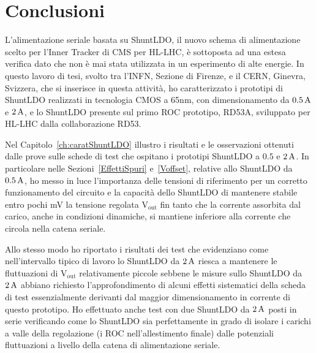 \chapter{Conclusioni}

L'alimentazione seriale basata su ShuntLDO, il nuovo schema di alimentazione scelto per l'Inner Tracker di CMS per HL-LHC, \`e sottoposta ad una estesa verifica dato che non \`e mai stata utilizzata in un esperimento di alte energie. In questo lavoro di tesi, svolto tra l'INFN, Sezione di Firenze, e il CERN, Ginevra, Svizzera, che si inserisce in questa attivit\`a, ho  caratterizzato i prototipi di ShuntLDO realizzati in tecnologia CMOS a 65nm, con dimensionamento da $0.5\rm \, A$ e $2\rm \, A$, e lo ShuntLDO presente sul primo ROC prototipo, RD53A, sviluppato per HL-LHC dalla collaborazione RD53.




Nel Capitolo~\ref{ch:caratShuntLDO} illustro i risultati e le osservazioni ottenuti dalle prove sulle schede di test che ospitano i prototipi ShuntLDO a $0.5$ e $2\rm \, A$. 
In particolare nelle Sezioni~\ref{EffettiSpuri} e~\ref{Voffset}, relative allo ShuntLDO da $0.5\rm \, A$, ho messo in luce l'importanza delle tensioni di riferimento per un corretto funzionamento del circuito e la capacità dello ShuntLDO di mantenere stabile entro pochi mV la tensione regolata $\mathrm{V_{out}}$ fin tanto che la corrente assorbita dal carico, anche in condizioni dinamiche, si mantiene inferiore alla corrente che circola nella catena seriale.

Allo stesso modo ho riportato i risultati dei test che evidenziano come nell'intervallo tipico di lavoro lo ShuntLDO da $2\rm \, A$ riesca a mantenere le fluttuazioni di $\mathrm{V_{out}}$ relativamente piccole sebbene le misure sullo ShuntLDO da $2\rm \, A$ abbiano richiesto l'approfondimento di alcuni effetti sistematici della scheda di test essenzialmente derivanti dal maggior dimensionamento in corrente di questo prototipo. Ho effettuato anche test con due ShuntLDO da $2\rm \, A$ posti in serie verificando come lo ShuntLDO sia perfettamente in grado di isolare i carichi a valle della regolazione (i ROC nell'allestimento finale) dalle potenziali fluttuazioni a livello della catena di alimentazione seriale.


